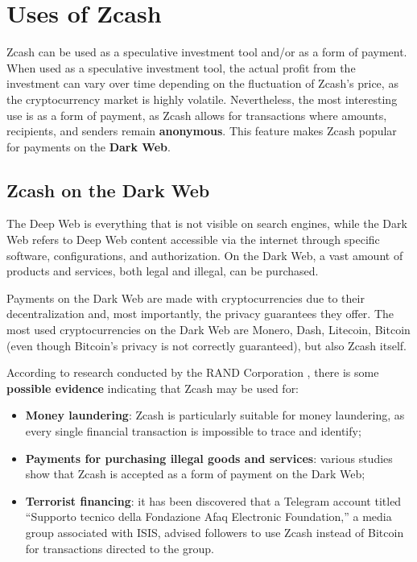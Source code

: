 \section{Uses of Zcash}

Zcash can be used as a speculative investment tool and/or as a form of payment. When used as a speculative investment tool, the actual profit from the investment can vary over time depending on the fluctuation of Zcash's price, as the cryptocurrency market is highly volatile. Nevertheless, the most interesting use is as a form of payment, as Zcash allows for transactions where amounts, recipients, and senders remain \textbf{anonymous}. This feature makes Zcash popular for payments on the \textbf{Dark Web}.

\subsection{Zcash on the Dark Web}

The Deep Web is everything that is not visible on search engines, while the Dark Web refers to Deep Web content accessible via the internet through specific software, configurations, and authorization. On the Dark Web, a vast amount of products and services, both legal and illegal, can be purchased.

\noindent Payments on the Dark Web are made with cryptocurrencies due to their decentralization and, most importantly, the privacy guarantees they offer. The most used cryptocurrencies on the Dark Web are Monero, Dash, Litecoin, Bitcoin (even though Bitcoin's privacy is not correctly guaranteed), but also Zcash itself.

\noindent According to research conducted by the RAND Corporation \cite{rand}, there is some \textbf{possible evidence} indicating that Zcash may be used for:
\begin{itemize}
    \item \textbf{Money laundering}: Zcash is particularly suitable for money laundering, as every single financial transaction is impossible to trace and identify;
    \item \textbf{Payments for purchasing illegal goods and services}: various studies show that Zcash is accepted as a form of payment on the Dark Web;
    \item \textbf{Terrorist financing}: it has been discovered that a Telegram account titled “Supporto tecnico della Fondazione Afaq Electronic Foundation,” a media group associated with ISIS, advised followers to use Zcash instead of Bitcoin for transactions directed to the group.
\end{itemize}

